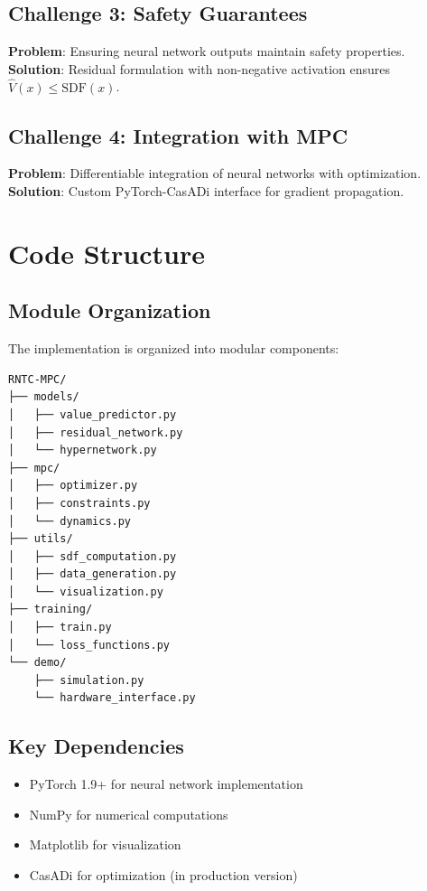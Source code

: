 \documentclass[12pt,a4paper]{article}
\begin{document}
\subsection{Challenge 3: Safety Guarantees}
\textbf{Problem}: Ensuring neural network outputs maintain safety properties.
\textbf{Solution}: Residual formulation with non-negative activation ensures $\hat{V}(x) \leq \text{SDF}(x)$.

\subsection{Challenge 4: Integration with MPC}
\textbf{Problem}: Differentiable integration of neural networks with optimization.
\textbf{Solution}: Custom PyTorch-CasADi interface for gradient propagation.

\section{Code Structure}

\subsection{Module Organization}
The implementation is organized into modular components:

\begin{lstlisting}[language=bash]
RNTC-MPC/
├── models/
│   ├── value_predictor.py
│   ├── residual_network.py
│   └── hypernetwork.py
├── mpc/
│   ├── optimizer.py
│   ├── constraints.py
│   └── dynamics.py
├── utils/
│   ├── sdf_computation.py
│   ├── data_generation.py
│   └── visualization.py
├── training/
│   ├── train.py
│   └── loss_functions.py
└── demo/
    ├── simulation.py
    └── hardware_interface.py
\end{lstlisting}

\subsection{Key Dependencies}
\begin{itemize}
    \item PyTorch 1.9+ for neural network implementation
    \item NumPy for numerical computations
    \item Matplotlib for visualization
    \item CasADi for optimization (in production version)
\end{itemize}
\end{document}
